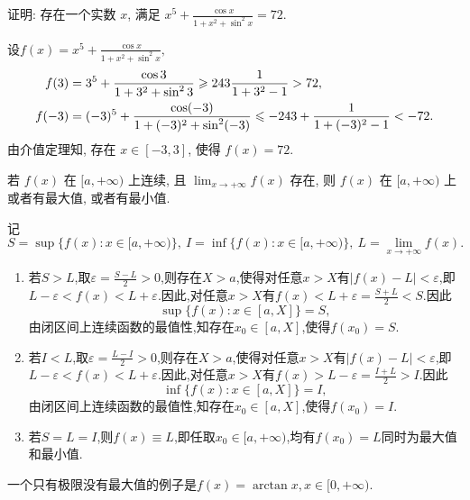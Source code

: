 \begin{exercise}[2.C.6]
    证明: 存在一个实数 $x$, 满足 $x^5 + \frac{\cos x}{1+x^2+\sin^2 x} = 72$.
\end{exercise}

\begin{solution}
    设$f(x)=x^5 + \frac{\cos x}{1+x^2+\sin^2 x} ,$
    \begin{align*}
        f(3) &= 3^5 + \frac{\cos 3}{1+3^2+\sin^2 3}  \geqslant 243 \frac{1}{1+3^2-1} > 72,\\
        f(-3) &= (-3)^5 + \frac{\cos (-3)}{1+(-3)^2+\sin^2 (-3)} \leqslant -243 + \frac{1}{1+(-3)^2-1} < -72.
    \end{align*}
    由介值定理知, 存在 $x \in [-3,3]$, 使得 $f(x) = 72$.
\end{solution}

\begin{exercise}[2.C.7]
    若 $f(x)$ 在 $[a, +\infty)$ 上连续, 且 $\lim_{x \to +\infty} f(x)$ 存在, 则 $f(x)$ 在 $[a, +\infty)$ 上或者有最大值, 或者有最小值.
\end{exercise}

\begin{solution}
    记$$S = \sup \{ f(x): x \in [a, +\infty) \}, \ I = \inf \{ f(x): x \in [a, +\infty) \}, \ L = \lim_{x \to +\infty} f(x).$$
    \begin{enumerate}
        \item 若$S > L$,取$\varepsilon = \frac{S-L}{2} > 0$,则存在$X > a$,使得对任意$x > X$有$|f(x)-L| < \varepsilon$,即$L - \varepsilon < f(x) < L + \varepsilon$.因此,对任意$x > X$有$f(x) < L + \varepsilon = \frac{S+L}{2} < S$.因此$$\sup \{ f(x): x \in [a, X] \} = S,$$由闭区间上连续函数的最值性,知存在$x_0 \in [a,X]$,使得$f(x_0) = S$.
        \item 若$I < L$,取$\varepsilon = \frac{L-I}{2} > 0$,则存在$X > a$,使得对任意$x > X$有$|f(x)-L| < \varepsilon$,即$L - \varepsilon < f(x) < L + \varepsilon$.因此,对任意$x > X$有$f(x) > L - \varepsilon = \frac{I+L}{2} > I$.因此$$\inf \{ f(x): x \in [a, X] \} = I,$$由闭区间上连续函数的最值性,知存在$x_0 \in [a,X]$,使得$f(x_0) = I$.
        \item 若$S = L = I$,则$f(x) \equiv L$,即任取$x_0 \in [a,+\infty)$,均有$f(x_0) = L$同时为最大值和最小值.
    \end{enumerate}
    \begin{remark}
        一个只有极限没有最大值的例子是$f(x) = \arctan x, x \in [0,+\infty)$.
    \end{remark}
\end{solution}

